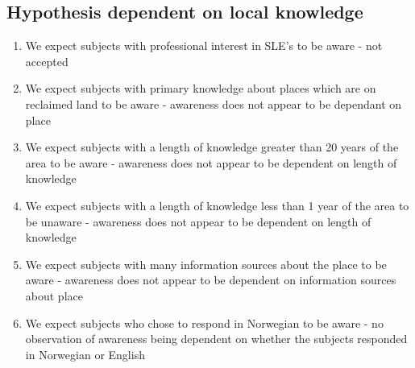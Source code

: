 \paragraph{}

\subsection{Hypothesis dependent on local knowledge}
\begin{enumerate}
    \item We expect subjects with professional interest in SLE's to be aware - not accepted
    \item We expect subjects with primary knowledge about places which are on reclaimed land to be aware - awareness does not appear to be dependant on place
    \item We expect subjects with a length of knowledge greater than 20 years of the area to be aware -  awareness does not appear to be dependent on length of knowledge
    \item We expect subjects with a length of knowledge less than 1 year of the area to be unaware -   awareness does not appear to be dependent on length of knowledge
    \item We expect subjects with many information sources about the place to be aware - awareness does not appear to be dependent on information sources about place
    \item We expect subjects who chose to respond in Norwegian to be aware - no observation of awareness being dependent on whether the subjects responded in Norwegian or English
\end{enumerate}
\paragraph{}

